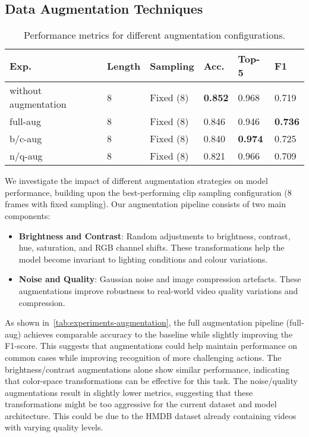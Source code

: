 \subsection{Data Augmentation Techniques}
\begin{table}[h]
    \centering
    \begin{tabular}{llllll}
    \hline
    \textbf{Exp.} & \textbf{Length} & \textbf{Sampling} & \textbf{Acc.} & \textbf{Top-5} & \textbf{F1} \\
    \hline
    without augmentation & 8 & Fixed (8) & \textbf{0.852} & 0.968 & 0.719 \\
    full-aug & 8 & Fixed (8) & 0.846 & 0.946 & \textbf{0.736} \\
    b/c-aug & 8 & Fixed (8) & 0.840 & \textbf{0.974} & 0.725 \\
    n/q-aug & 8 & Fixed (8) & 0.821 & 0.966 & 0.709 \\
    \end{tabular}
    \caption{Performance metrics for different augmentation configurations.}\label{tab:experiments-augmentation}
\end{table}

We investigate the impact of different augmentation strategies on model performance, building upon the best-performing clip sampling configuration (8 frames with fixed sampling).
Our augmentation pipeline consists of two main components:

\begin{itemize}
    \item \textbf{Brightness and Contrast}: Random adjustments to brightness, contrast, hue, saturation, and RGB channel shifts. 
    These transformations help the model become invariant to lighting conditions and colour variations.
    
    \item \textbf{Noise and Quality}: Gaussian noise and image compression artefacts. These augmentations improve robustness to real-world video quality variations and compression.
\end{itemize}

As shown in~\autoref{tab:experiments-augmentation}, the full augmentation pipeline (full-aug) achieves comparable accuracy to the baseline while slightly improving the F1-score.
This suggests that augmentations could help maintain performance on common cases while improving recognition of more challenging actions. 
The brightness/contrast augmentations alone show similar performance, indicating that color-space transformations can be effective for this task.
The noise/quality augmentations result in slightly lower metrics, suggesting that these transformations might be too aggressive for the current dataset and model architecture. 
This could be due to the HMDB dataset already containing videos with varying quality levels.

